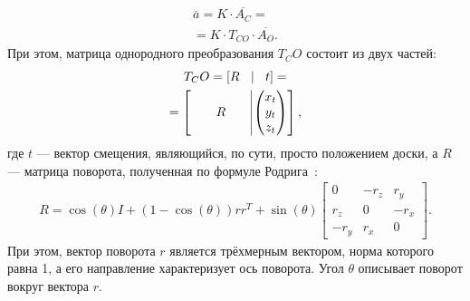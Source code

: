 \documentclass[14pt, a4paper]{extarticle}
\begin{document}
\begin{equation}
\begin{gathered}
    \overline{a} = K \cdot \overline{A_C} = \\
    = K \cdot T_{CO} \cdot \overline{A_O}.
\end{gathered}
\label{eqn:full_projection}
\end{equation}
При этом, матрица однородного преобразования $T_CO$ состоит из двух частей:
\begin{equation}
\begin{gathered}
    T_CO = \left[ R \quad \vline \quad t \right] = \\
    = \left[
        \qquad R \qquad \vline \begin{pmatrix}
        x_t\\
        y_t\\
        z_t
    \end{pmatrix}
    \right],
\end{gathered}
\label{eqn:projection_matrix_tf}
\end{equation}
где $t$ --- вектор смещения, являющийся, по сути, просто положением доски, а $R$ ---
матрица поворота, полученная по формуле Родрига~\cite{opencv_rodrigues}:
\begin{equation}
\begin{gathered}
    R = \cos(\theta) I + (1 - \cos(\theta))r r^T + \sin(\theta) \begin{bmatrix}
         0   & -r_z & r_y\\
        r_z  & 0    & -r_x\\
        -r_y & r_x  & 0
    \end{bmatrix}.
\end{gathered}
\label{eqn:rodrigues_formula}
\end{equation}
При этом, вектор поворота $r$ является трёхмерным вектором, норма которого равна
1, а его направление характеризует ось поворота. Угол $\theta$ описывает поворот вокруг вектора $r$.
\end{document}
